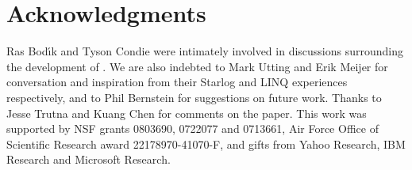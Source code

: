 \section{Acknowledgments}
Ras Bod\'{\i}k and Tyson Condie were intimately involved in discussions surrounding the development of \lang.  We are also indebted to Mark Utting and Erik Meijer for conversation and inspiration from their Starlog and LINQ experiences respectively, and to Phil Bernstein for suggestions on future work.  Thanks to Jesse Trutna and Kuang Chen for comments on the paper. This work was supported by NSF grants 0803690, 0722077 and 0713661, Air Force Office of Scientific Research award 22178970-41070-F, and gifts from Yahoo Research, IBM Research and Microsoft Research.
